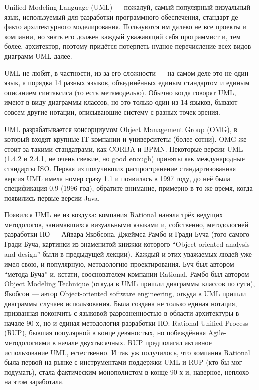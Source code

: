 \documentclass[a5paper]{article}
\begin{document}
Unified Modeling Language (UML) --- пожалуй, самый популярный визуальный язык, используемый для разработки программного обеспечения, стандарт де-факто архитектурного моделирования. Пользуются им далеко не все проекты и компании, но знать его должен каждый уважающий себя программист и, тем более, архитектор, поэтому придётся потерпеть нудное перечисление всех видов диаграмм UML далее. 

UML не любят, в частности, из-за его сложности --- на самом деле это не один язык, а порядка 14 разных языков, объединённых единым стандартом и единым описанием синтаксиса (то есть метамоделью). Обычно когда говорят UML, имеют в виду диаграммы классов, но это только один из 14 языков, бывают совсем другие нотации, описывающие систему с разных точек зрения.

UML разрабатывается консорциумом Object Management Group (OMG), в который входят крупные IT-компании и университеты (более сотни). OMG же стоит за такими стандатрами, как CORBA и BPMN. Некоторые версии UML (1.4.2 и 2.4.1, не очень свежие, но good enough) приняты как международные стандарты ISO. Первая из получивших распространение стандартизованная версия UML имела номер сразу 1.1 и появилась в 1997 году, до неё была спецификация 0.9 (1996 год), обратите внимание, примерно в то же время, когда появились первые версии Java. 

Появился UML не из воздуха: компания Rational наняла трёх ведущих методологов, занимавшихся визуальными языками и, собственно, методологией разработки ПО --- Айвара Якобсона, Джеймса Рамбо и Гради Буча (того самого Гради Буча, картинки из знаменитой книжки которого ``Object-oriented analysis and design'' были в предыдущей лекции). Каждый и этих уважаемых людей уже имел свою, и популярную, методологию проектирования. Буч был автором ``метода Буча'' и, кстати, сооснователем компании Rational, Рамбо был автором Object Modeling Technique (откуда в UML пришли диаграммы классов по сути), Якобсон --- автор Object-oriented software engineering, откуда в UML пришли диаграммы случаев использования. Была создана не только единая нотация, призванная покончить с языковой разрозненностью в области архитектуры в начале 90-х, но и единая методология разработки ПО: Rational Unified Process (RUP), бывшая популярной в конце девяностых, но побеждённая Agile-методологиями в начале двухтысячных. RUP предполагал активное использование UML, естественно. И так уж получилось, что компания Rational была первой на рынке с инструментами поддержки UML и RUP (кто бы мог подумать), стала фактическим монополистом в конце 90-х и, наверное, неплохо на этом заработала.
\end{document}
